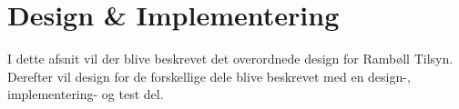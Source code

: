 \chapter{Design \& Implementering}
I dette afsnit vil der blive beskrevet det overordnede design for Rambøll Tilsyn. Derefter vil design for de forskellige dele blive beskrevet med en design-, implementering- og test del. \\


